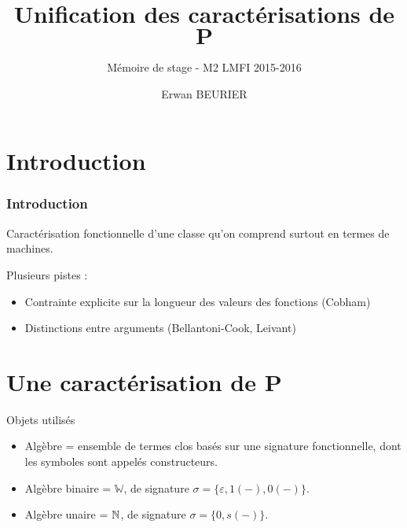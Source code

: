 \documentclass[10pt]{beamer}
\author{Erwan BEURIER}
\title{Unification des caractérisations de $\textbf{P}$}
\subtitle{Mémoire de stage - M2 LMFI 2015-2016}
\newcommand{\bbW}{\mathbb{W}}
\begin{document}
    \begin{frame}
		\titlepage
    \end{frame}
	
	\section*{Introduction}

	\begin{frame}
	\frametitle{Introduction}
		\begin{block}
			
			Caractérisation fonctionnelle d'une classe qu'on comprend surtout en termes de machines.
			
			\pause 

			Plusieurs pistes : 
			\begin{itemize}
				\item 	Contrainte explicite sur la longueur des valeurs des fonctions (Cobham)
				\item 	Distinctions entre arguments (Bellantoni-Cook, Leivant)
			\end{itemize}
			
%			
%			
		\end{block}
	\end{frame}
	
	\begin{frame}
		\tableofcontents
	\end{frame}
	\section{Une caractérisation de P}
	
	\begin{frame}
		\begin{block}{Objets utilisés}
			\begin{itemize}
				\item 	Algèbre = ensemble de termes clos basés sur une signature fonctionnelle, dont les symboles sont appelés constructeurs.
				\pause
				\item 	Algèbre binaire = $\bbW$, de signature $\sigma = \{\varepsilon, 1(-), 0(-) \}$.
				\item 	Algèbre unaire = $\mathbb{N}$, de signature $\sigma = \{ 0, s(-) \}$.
			\end{itemize}
		\end{block}
	\end{frame}
	
\end{document}
